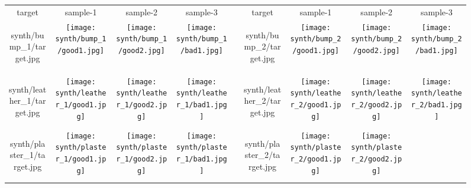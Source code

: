 \begin{figure*}[t]
	\centering
	\addtolength{\tabcolsep}{-4.5pt}
	\begin{tabular}{ccccccccc}
		target & sample-1 & sample-2 & sample-3 & & target & sample-1 & sample-2 & sample-3
		\\
		\begin{overpic}[width=\resultwidth]{synth/bump_1/target.jpg}
			\imglabel{Bump-1}
		\end{overpic} &
		\texttt{[image: synth/bump\_1/good1.jpg]} &
		\texttt{[image: synth/bump\_1/good2.jpg]} &
		\texttt{[image: synth/bump\_1/bad1.jpg]} &
		&
		\begin{overpic}[width=\resultwidth]{synth/bump_2/target.jpg}
			\imglabel{Bump-2}
		\end{overpic} &
		\texttt{[image: synth/bump\_2/good1.jpg]} &
		\texttt{[image: synth/bump\_2/good2.jpg]} &
		\texttt{[image: synth/bump\_2/bad1.jpg]}
		\\
		\begin{overpic}[width=\resultwidth]{synth/leather_1/target.jpg}
			\imglabel{Leather-1}
		\end{overpic} &
		\texttt{[image: synth/leather\_1/good1.jpg]} &
		\texttt{[image: synth/leather\_1/good2.jpg]} &
		\texttt{[image: synth/leather\_1/bad1.jpg]} &
		&
		\begin{overpic}[width=\resultwidth]{synth/leather_2/target.jpg}
			\imglabel{Leather-2}
		\end{overpic} &
		\texttt{[image: synth/leather\_2/good1.jpg]} &
		\texttt{[image: synth/leather\_2/good2.jpg]} &
		\texttt{[image: synth/leather\_2/bad1.jpg]}
		\\
		\begin{overpic}[width=\resultwidth]{synth/plaster_1/target.jpg}
			\imglabel{Plaster-1}
		\end{overpic} &
		\texttt{[image: synth/plaster\_1/good1.jpg]} &
		\texttt{[image: synth/plaster\_1/good2.jpg]} &
		\texttt{[image: synth/plaster\_1/bad1.jpg]} &
		&
		\begin{overpic}[width=\resultwidth]{synth/plaster_2/target.jpg}
			\imglabel{Plaster-2}
		\end{overpic} &
		\texttt{[image: synth/plaster\_2/good1.jpg]} &
		\texttt{[image: synth/plaster\_2/good2.jpg]} &

\end{tabular}
\end{figure*}
